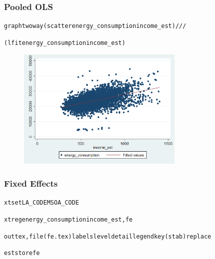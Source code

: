 \documentclass{beamer}
\begin{document}
  \begin{frame}
    \frametitle{Pooled OLS}
    \footnotesize
    \begin{alltt}
    graph twoway (scatter energy\_consumption income\_est) ///
    
    (lfit energy\_consumption income\_est)
    \end{alltt}
    
    \begin{figure}
    \includegraphics[width=8cm]{../stata_code/ols.png}
    \centering
    \end{figure}
  \end{frame}
  
  \begin{frame}
    \frametitle{Fixed Effects}
    \footnotesize
    \begin{alltt}
    xtset LA\_CODE MSOA\_CODE
    
    xtreg energy\_consumption income\_est, fe
    
    outtex, file(fe.tex) labels level detail legend key(stab) replace
    
    est store fe
    \end{alltt}
    
    
    
  \end{frame}
  
\end{document}
